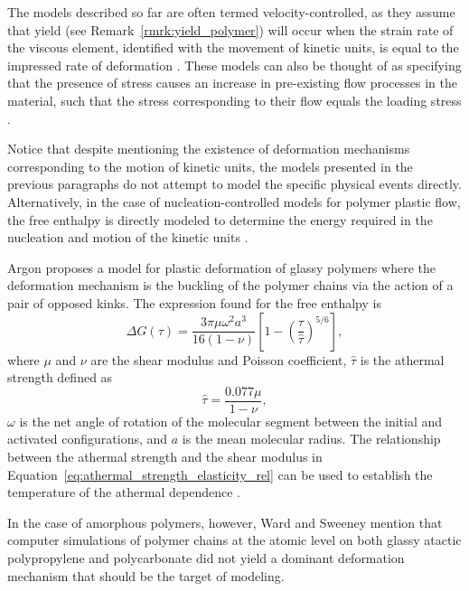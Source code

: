 The models described so far are often termed velocity-controlled, as they assume that yield (see Remark~\ref{rmrk:yield_polymer}) will occur when the strain rate of the viscous element, identified with the movement of kinetic units, is equal to the impressed rate of deformation \citep{fotheringhamRoleRecoveryForces1978}.
These models can also be thought of as specifying that the presence of stress causes an increase in pre-existing flow processes in the material, such that the stress corresponding to their flow equals the loading stress \citep{wardIntroductionMechanicalProperties2004}.

Notice that despite mentioning the existence of deformation mechanisms corresponding to the motion of kinetic units, the models presented in the previous paragraphs do not attempt to model the specific physical events directly.
Alternatively, in the case of nucleation-controlled models for polymer plastic flow, the free enthalpy is directly modeled to determine the energy required in the nucleation and motion of the kinetic units \citep{fotheringhamRoleRecoveryForces1978, wardIntroductionMechanicalProperties2004}.

Argon \citep{argonTheoryLowtemperaturePlastic1973} proposes a model for plastic deformation of glassy polymers where the deformation mechanism is the buckling of the polymer chains via the action of a pair of opposed kinks.
The expression found for the free enthalpy is
\begin{equation}
	\label{eq:argon_model_free_enthalpy}
	\Delta G(\tau)=\frac{3 \pi \mu \omega^2 a^3}{16(1-\nu)}\left[1-\left(\frac{\tau}{\hat \tau}\right)^{5 / 6}\right],
\end{equation}
where $\mu$ and $\nu$ are the shear modulus and Poisson coefficient, $\hat \tau$ is the athermal strength defined as
\begin{equation}
  \label{eq:athermal_strength_elasticity_rel}
	\hat \tau = \frac{0.077 \mu}{1-\nu},
\end{equation}
$\omega$ is the net angle of rotation of the molecular segment between the initial and activated configurations, and $a$ is the mean molecular radius.
The relationship between the athermal strength and the shear modulus in Equation~\eqref{eq:athermal_strength_elasticity_rel} can be used to establish the temperature of the athermal dependence \citep{haoUnifiedAmorphousCrystalline2022}.

In the case of amorphous polymers, however, Ward and Sweeney \citep{wardIntroductionMechanicalProperties2004} mention that computer simulations of polymer chains at the atomic level on both glassy atactic polypropylene and polycarbonate did not yield a dominant deformation mechanism that should be the target of modeling.

